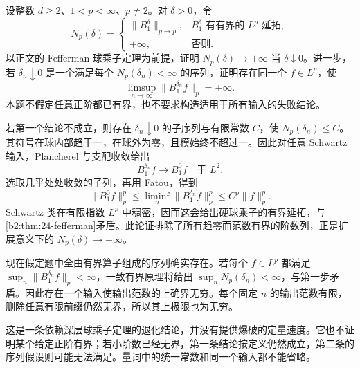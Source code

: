 \begin{exercise}\label{b2:ex:24-new-7}
设整数 \(d\geq2\)、\(1<p<\infty\)、\(p\ne2\)。对 \(\delta>0\)，令
\[
 N_p(\delta)=
 \begin{cases}
 \|B_1^\delta\|_{p\to p},&B_1^\delta\text{ 有有界的 }L^p\text{ 延拓},\\
 +\infty,&\text{否则}.
 \end{cases}
\]
以正文的 Fefferman 球乘子定理为前提，证明
\(N_p(\delta)\to+\infty\) 当 \(\delta\downarrow0\)。进一步，若 \(\delta_n\downarrow0\) 是一个满足每个 \(N_p(\delta_n)<\infty\) 的序列，证明存在同一个 \(f\in L^p\)，使
\[
 \limsup_{n\to\infty}\|B_1^{\delta_n}f\|_p=+\infty.
\]
本题不假定任意正阶都已有界，也不要求构造适用于所有输入的失败结论。
\end{exercise}
\begin{solution}
若第一个结论不成立，则存在 \(\delta_n\downarrow0\) 的子序列与有限常数 \(C\)，使 \(N_p(\delta_n)\leq C\)。其符号在球内部趋于一，在球外为零，且模始终不超过一。因此对任意 Schwartz 输入，Plancherel 与支配收敛给出
\[
 B_1^{\delta_n}f\longrightarrow B_1^0f\quad\text{于 }L^2.
\]
选取几乎处处收敛的子列，再用 Fatou，得到
\[
 \|B_1^0f\|_p^p
 \leq\liminf_n\|B_1^{\delta_n}f\|_p^p
 \leq C^p\|f\|_p^p.
\]
Schwartz 类在有限指数 \(L^p\) 中稠密，因而这会给出硬球乘子的有界延拓，与\cref{b2:thm:24-fefferman}矛盾。此论证排除了所有趋零而范数有界的阶数列，正是扩展意义下的 \(N_p(\delta)\to+\infty\)。

现在假定题中全由有界算子组成的序列确实存在。若每个 \(f\in L^p\) 都满足 \(\sup_n\|B_1^{\delta_n}f\|_p<\infty\)，一致有界原理将给出
\(\sup_nN_p(\delta_n)<\infty\)，与第一步矛盾。因此存在一个输入使输出范数的上确界无穷。每个固定 \(n\) 的输出范数有限，删除任意有限前缀仍然无界，所以其上极限也为无穷。

这是一条依赖深层球乘子定理的退化结论，并没有提供爆破的定量速度。它也不证明某个给定正阶有界；若小阶数已经无界，第一条结论按定义仍然成立，第二条的序列假设则可能无法满足。量词中的统一常数和同一个输入都不能省略。
\end{solution}

